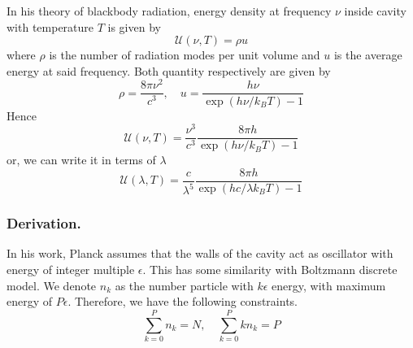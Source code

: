 \documentclass[../../../Main.tex]{subfiles}
\begin{document}
In his theory of blackbody radiation, energy density at frequency $\nu$ inside cavity with temperature $T$ is given by
\begin{equation*}
    \mathcal{U}(\nu,T)=\rho u
\end{equation*}
where $\rho$ is the number of radiation modes per unit volume and $u$ is the average energy at said frequency. Both quantity respectively are given by 
\begin{equation*}
    \rho=\frac{8\pi\nu^2}{c^3},\quad u=\frac{h\nu}{\exp(h\nu/k_BT)-1}
\end{equation*}
Hence
\begin{equation*}
    \mathcal{U}(\nu,T)=\frac{\nu^3}{c^3}\frac{8\pi h}{\exp(h\nu/k_BT)-1}
\end{equation*}
or, we can write it in terms of $\lambda$
\begin{equation*}
    \mathcal{U}(\lambda,T)=\frac{c}{\lambda^5}\frac{8\pi h}{\exp(hc/\lambda k_BT)-1}
\end{equation*}
\subsubsection*{Derivation.} In his work, Planck assumes that the walls of the cavity act as oscillator with  energy of integer multiple $\epsilon$. This has some similarity with Boltzmann discrete model. We denote $n_k$ as the number particle with $k\epsilon$ energy, with maximum energy of $P\epsilon$. Therefore, we have the following constraints.
\begin{equation*}
    \sum_{k=0}^{P}n_k=N,\quad\sum_{k=0}^{P}kn_k=P
\end{equation*}
\end{document}
